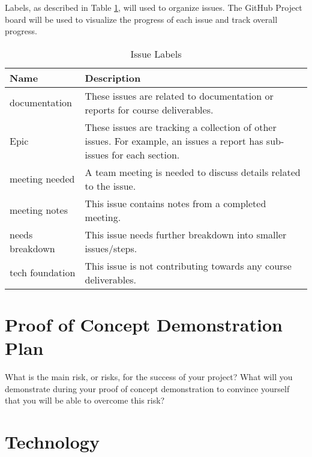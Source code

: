 \documentclass{article}
\begin{document}
Labels, as described in Table \ref{issueLabels}, will used to organize issues. The GitHub Project
board will be used to visualize the progress of each issue and track overall progress.

\begin{table}[H]
  \centering
  \caption{Issue Labels}
  \vspace{5pt}
  \begin{tabular}{|p{}|p{}|}
    \hline
    \textbf{Name}   & \textbf{Description}                                                                    \\
    \hline
    documentation   & These issues are related to documentation or reports for course deliverables.           \\
    \hline
    Epic            & These issues are tracking a collection of other issues. For example, an issues a report
    has sub-issues for each section.                                                                          \\
    \hline
    meeting needed  & A team meeting is needed to discuss details related to the issue.                       \\
    \hline
    meeting notes   & This issue contains notes from a completed meeting.                                     \\
    \hline
    needs breakdown & This issue needs further breakdown into smaller issues/steps.                           \\
    \hline
    tech foundation & This issue is not contributing towards any course deliverables.                         \\
    \hline
  \end{tabular}

  \label{issueLabels}
\end{table}

\section{Proof of Concept Demonstration Plan}

What is the main risk, or risks, for the success of your project? What will you demonstrate during
your proof of concept demonstration to convince yourself that you will be able to overcome this
risk?

\section{Technology}
\end{document}
